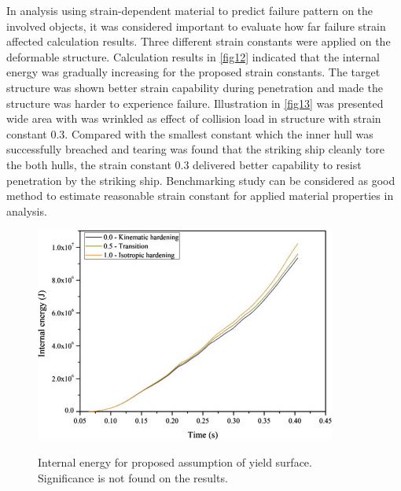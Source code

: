 \documentclass[../Final.tex]{subfiles}
\begin{document}
In analysis using strain-dependent material to predict failure pattern on the involved objects, it was considered important to evaluate how far failure strain affected calculation results. 
Three different strain constants were applied on the deformable structure. 
Calculation results in \ref{fig12} indicated that the internal energy was gradually increasing for the proposed strain constants. 
The target structure was shown better strain capability during penetration and made the structure was harder to experience failure. Illustration in \ref{fig13} was presented wide area with was wrinkled as effect 
of collision load in structure with strain constant 0.3. Compared with the smallest constant which the inner hull was successfully breached and tearing was found that the striking ship cleanly tore the both hulls, 
the strain constant 0.3 delivered better capability to resist penetration by the striking ship. 
Benchmarking study can be considered as good method to estimate reasonable strain constant for applied material properties in analysis. 

\begin{figure}[h]
    \centering
    \includegraphics[width=\columnwidth]{fig14.jpg}
    \label{fig14}
    \caption{Internal energy for proposed assumption of yield surface. Significance is not found on the results.}
\end{figure}
\end{document}
